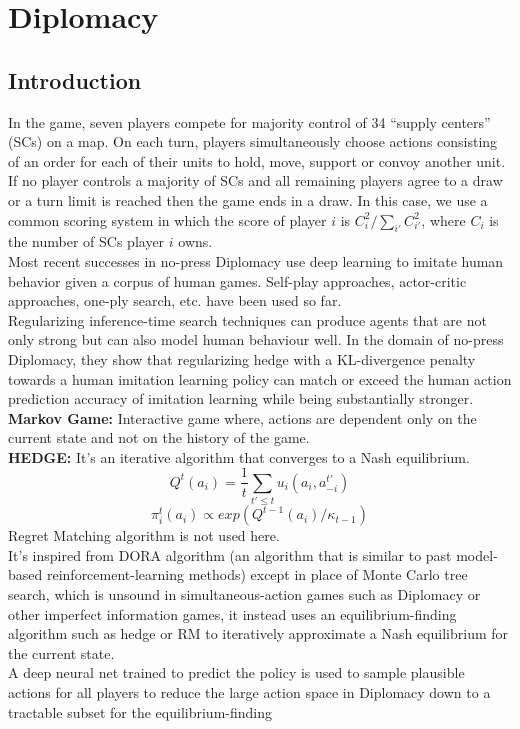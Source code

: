 \documentclass[12pt]{article}
\begin{document}
\section{Diplomacy}
\subsection{Introduction}
In the game, seven players compete for majority control of 34 “supply centers” (SCs) on a map.
On each turn, players simultaneously choose actions consisting of an order for each of their units to
hold, move, support or convoy another unit. If no player controls a majority of SCs and all remaining
players agree to a draw or a turn limit is reached then the game ends in a draw. In this case, we use
a common scoring system in which the score of player $i$ is $C_i^2/\sum_{i'}C_{i'}^2$, where $C_i$ is the number of SCs player $i$ owns.\\
Most recent successes in no-press Diplomacy use deep learning to imitate human behavior given a
corpus of human games. Self-play approaches, actor-critic approaches, one-ply search, etc. have been used so far.\\
Regularizing inference-time search techniques can produce agents
that are not only strong but can also model human behaviour well. In the domain of no-press Diplomacy, they show that regularizing hedge with a KL-divergence
penalty towards a human imitation learning policy can match or exceed the human action prediction
accuracy of imitation learning while being substantially stronger.
\textbf{Markov Game:} Interactive game where, actions are dependent only on the current state and not on the history of the game.\\
\textbf{HEDGE:} It's an iterative algorithm that converges to a Nash equilibrium. 
\[Q^t(a_i)=\dfrac{1}{t}\sum_{t'\leq t}u_i(a_i,a^{t'}_{-i})\]
\[\pi_i^t(a_i)\propto exp(Q^{t-1}(a_i)/\kappa_{t-1})\]
Regret Matching algorithm is not used here.\\ 
It's inspired from DORA algorithm (an algorithm that is similar to past model-based
reinforcement-learning methods)   except in place of Monte Carlo tree search, which is unsound in simultaneous-action games such as Diplomacy or other imperfect information games, it instead uses an equilibrium-finding algorithm such as hedge or RM to iteratively approximate a Nash equilibrium for the current state.
\\ 
A deep neural net trained to predict the policy is used to sample plausible actions for all players to
reduce the large action space in Diplomacy down to a tractable subset for the equilibrium-finding
\end{document}
